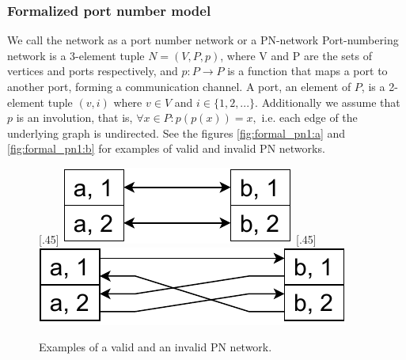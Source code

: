 \subsubsection{Formalized port number model}
We call the network as a port number network or a PN-network
Port-numbering network is a 3-element tuple $N = (V, P, p)$, where V and P are the sets of vertices and ports respectively, and $p: P \rightarrow P$ is a function that maps a port to another port, forming a communication channel.
A port, an element of $P$, is a 2-element tuple $(v, i)$ where $v \in V$ and $i \in \{1, 2, ...\}$.
Additionally we assume that $p$ is an involution, that is, $\forall x \in P : p(p(x)) = x, $ i.e. each edge of the underlying graph is undirected.
See the figures \ref{fig:formal_pn1:a} and \ref{fig:formal_pn1:b} for examples of valid and invalid PN networks.

\begin{figure}[h]
    [.45\linewidth] {
    \centering
    \includegraphics[scale=0.6]{diagrams/formalizing_pn_network_diagram1.pdf}
  }
  \hfill
    [.45\linewidth] {
    \centering
    \includegraphics[scale=0.6]{diagrams/formalizing_pn_network_diagram2.pdf}
  }
  \caption{Examples of a valid and an invalid PN network.}
  \label{fig:formal_pn1}
\end{figure}


